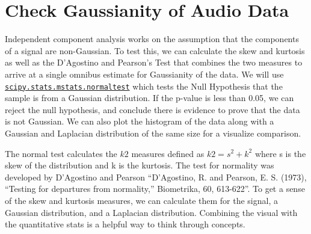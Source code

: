 \documentclass[12pt]{article}
\begin{document}
    \hypertarget{check-gaussianity-of-audio-data}{%
\section{Check Gaussianity of Audio
Data}\label{check-gaussianity-of-audio-data}}

Independent component analysis works on the assumption that the
components of a signal are non-Gaussian. To test this, we can calculate
the skew and kurtosis as well as the D'Agostino and Pearson's Test that
combines the two measures to arrive at a single omnibus estimate for
Gaussianity of the data. We will use
\href{https://docs.scipy.org/doc/scipy-0.14.0/reference/generated/scipy.stats.mstats.normaltest.html}{\texttt{scipy.stats.mstats.normaltest}}
which tests the Null Hypothesis that the sample is from a Gaussian
distribution. If the p-value is less than 0.05, we can reject the null
hypothesis, and conclude there is evidence to prove that the data is not
Gaussian. We can also plot the histogram of the data along with a
Gaussian and Laplacian distribution of the same size for a visualize
comparison.

The normal test calculates the \(k2\) measures defined as
\(k2 = s^2 + k^2\) where s is the skew of the distribution and k is the
kurtosis. The test for normality was developed by D'Agostino and Pearson
``D'Agostino, R. and Pearson, E. S. (1973), ``Testing for departures
from normality,'' Biometrika, 60, 613-622''. To get a sense of the skew
and kurtosis measures, we can calculate them for the signal, a Gaussian
distribution, and a Laplacian distribution. Combining the visual with
the quantitative stats is a helpful way to think through concepts.
\end{document}
